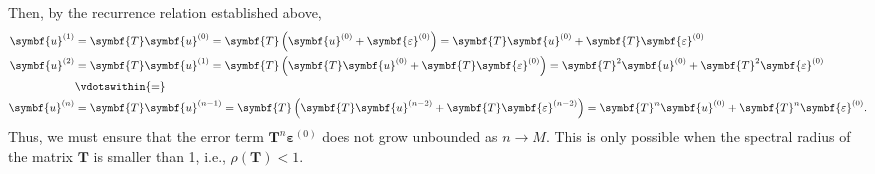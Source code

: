 \documentclass{article}
\begin{document}
Then, by the recurrence relation established above,
\begin{align*}
    \symbf{u}^{\left( 1 \right)} & = \symbf{T} \symbf{u}^{\left( 0 \right)} = \symbf{T} \left( \symbf{u}^{\left( 0 \right)} + \symbf{\varepsilon}^{\left( 0 \right)} \right) = \symbf{T} \symbf{u}^{\left( 0 \right)} + \symbf{T} \symbf{\varepsilon}^{\left( 0 \right)}                                \\
    \symbf{u}^{\left( 2 \right)} & = \symbf{T} \symbf{u}^{\left( 1 \right)} = \symbf{T} \left( \symbf{T} \symbf{u}^{\left( 0 \right)} + \symbf{T} \symbf{\varepsilon}^{\left( 0 \right)} \right) = \symbf{T}^2 \symbf{u}^{\left( 0 \right)} + \symbf{T}^2 \symbf{\varepsilon}^{\left( 0 \right)}        \\
                                 & \vdotswithin{=}                                                                                                                                                                                                                                                      \\
    \symbf{u}^{\left( n \right)} & = \symbf{T} \symbf{u}^{\left( n-1 \right)} = \symbf{T} \left( \symbf{T} \symbf{u}^{\left( n-2 \right)} + \symbf{T} \symbf{\varepsilon}^{\left( n-2 \right)} \right) = \symbf{T}^n \symbf{u}^{\left( 0 \right)} + \symbf{T}^n \symbf{\varepsilon}^{\left( 0 \right)}.
\end{align*}
Thus, we must ensure that the error term \(\symbf{T}^n \symbf{\varepsilon}^{\left( 0 \right)}\)
does not grow unbounded as \(n \to M\). This is only possible when the
spectral radius of the matrix \(\symbf{T}\) is smaller than 1, i.e.,
\(\rho\left( \symbf{T} \right) < 1\).
\end{document}
